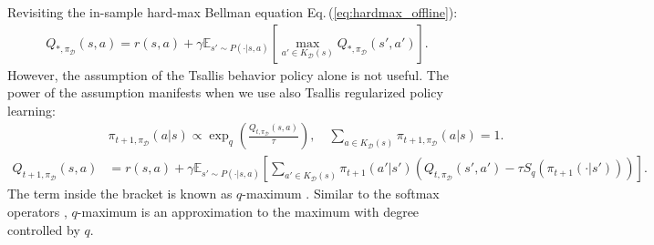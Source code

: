 \documentclass{article}
\newcommand{\AdaBracket}[1]{\left(#1\right)}
\newcommand{\AdaRectBracket}[1]{\left[#1\right]}
\newcommand{\expectation}[2]{\mathbb{E}_{#1}\AdaRectBracket{#2}}
\newcommand{\eq}[1]{Eq.\,(#1)}
\newcommand{\datasetOptimalQ}{Q_{*, \pi_{\mathcal{D}}}}
\newcommand{\datasetPolicy}{\pi_{\mathcal{D}}}
\begin{document}
Revisiting the in-sample hard-max Bellman equation \eq{\ref{eq:hardmax_offline}}:
\begin{align*}
    \datasetOptimalQ(s,a) = r(s,a) + \gamma \expectation{s'\sim P(\cdot | s,a)}{\max_{a'\in K_{\mathcal{D}}(s)} \datasetOptimalQ(s',a')}.
\end{align*}
However, the assumption of the Tsallis behavior policy alone is not useful.
The power of the assumption manifests when we use also Tsallis regularized policy learning:
\begin{align}
    & \pi_{t+1, \datasetPolicy}(a|s) \propto \exp_q\AdaBracket{\frac{Q_{t, \datasetPolicy}(s,a)}{\tau}},  \quad \sum_{a\in K_{\mathcal{D}}(s)} \pi_{t+1, \datasetPolicy} (a|s) = 1.\\
    Q_{t+1, \datasetPolicy}(s,a) &= r(s,a) +  \gamma \expectation{s'\sim P(\cdot | s,a)}{ \sum_{a' \in K_{\mathcal{D}}(s)} \!\!\!\!\! \pi_{t+1}(a'|s') \AdaBracket{Q_{t, \datasetPolicy}(s',a') - \tau S_q(\pi_{t+1}(\cdot|s'))}}.
    \label{eq:proposal_policy}
\end{align}
The term inside the bracket is known as $q$-maximum \cite{Lee2020-generalTsallisRSS}.
Similar to the softmax operators \cite{asadi17a,azar2012dynamic}, $q$-maximum is an approximation to the maximum with degree controlled by $q$.
\end{document}
